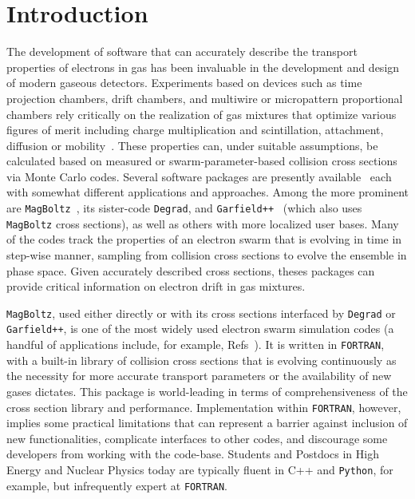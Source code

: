 \documentclass[3p,11pt]{elsarticle}
\begin{document}


\section{Introduction}
\label{intro}
The development of software that can accurately describe the transport properties of electrons in gas has been invaluable in the development and design of modern gaseous detectors.  Experiments based on devices such as time projection chambers, drift chambers, and multiwire or micropattern proportional chambers rely critically on the realization of gas mixtures that optimize various figures of merit including  charge multiplication and scintillation, attachment, diffusion or mobility~\cite{sauli2014gaseous,Gonzalez-Diaz:2017gxo}.  These properties can, under suitable assumptions, be calculated based on measured or swarm-parameter-based collision cross sections via Monte Carlo codes.  Several software packages are presently available~\cite{Veenhof:2009zza} each with somewhat different applications and approaches. Among the more prominent are {\tt MagBoltz}~\cite{biagi1999monte}, its sister-code {\tt Degrad}, and {\tt Garfield++}~\cite{Garfield} (which also uses {\tt MagBoltz} cross sections), as well as others with more localized user bases. Many of the codes track the properties of an electron swarm that is evolving in time in step-wise manner, sampling from collision cross sections to evolve the ensemble in phase space. Given accurately described cross sections, theses packages can provide critical information on electron drift in gas mixtures. 

{\tt MagBoltz}, used either directly or with its cross sections interfaced by {\tt Degrad} or {\tt Garfield++}, is one of the most widely used electron swarm simulation codes (a handful of applications include, for example, Refs~\cite{Ruiz-Choliz:2015daa,Azevedo:2014hka,riegler2003detector,Burns:2017dny,Sahin:2018ybn,Simon:2018vep}). It is written in {\tt FORTRAN}, with a built-in library of collision cross sections that is evolving continuously as the necessity for more accurate transport parameters or the availability of new gases dictates.  This package is world-leading in terms of comprehensiveness of the cross section library and performance.  Implementation within {\tt FORTRAN}, however, implies some practical limitations that can represent a barrier against inclusion of new functionalities, complicate interfaces to other codes, and discourage some developers from working with the code-base. Students and Postdocs in High Energy and Nuclear Physics today are typically fluent in C++ and {\tt Python}, for example, but infrequently expert at {\tt FORTRAN}.
\end{document}
